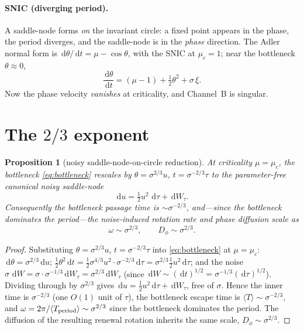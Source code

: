 \documentclass[11pt]{article}
\newtheorem{proposition}{Proposition}
\theoremstyle{remark}
\newcommand{\dd}{\,\mathrm{d}}
\begin{document}
\paragraph{SNIC (diverging period).} A saddle-node forms \emph{on} the invariant circle: a
fixed point appears in the phase, the period diverges, and the saddle-node is in the
\emph{phase} direction. The Adler normal form is $\dd\theta/\dd t=\mu-\cos\theta$, with the
SNIC at $\mu_c=1$; near the bottleneck $\theta\approx0$,
\begin{equation}\label{eq:bottleneck}
  \frac{\dd\theta}{\dd t}=(\mu-1)+\tfrac12\theta^2+\sigma\,\xi .
\end{equation}
Now the phase velocity \emph{vanishes} at criticality, and Channel~B is singular.

\section{The $2/3$ exponent}

\begin{proposition}[noisy saddle-node-on-circle reduction]\label{prop:23}
At criticality $\mu=\mu_c$, the bottleneck \eqref{eq:bottleneck} rescales by
$\theta=\sigma^{2/3}u$, $t=\sigma^{-2/3}\tau$ to the parameter-free canonical noisy
saddle-node
\[
  \dd u=\tfrac12 u^2\,\dd\tau+\dd W_\tau .
\]
Consequently the bottleneck passage time is $\sim\sigma^{-2/3}$, and---since the bottleneck
dominates the period---the noise-induced rotation rate and phase diffusion scale as
\[
  \omega\sim\sigma^{2/3},\qquad D_\phi\sim\sigma^{2/3}.
\]
\end{proposition}

\begin{proof}
Substituting $\theta=\sigma^{2/3}u$, $t=\sigma^{-2/3}\tau$ into \eqref{eq:bottleneck} at
$\mu=\mu_c$: $\dd\theta=\sigma^{2/3}\dd u$; $\tfrac12\theta^2\dd t=\tfrac12\sigma^{4/3}u^2\cdot
\sigma^{-2/3}\dd\tau=\sigma^{2/3}\tfrac12 u^2\dd\tau$; and the noise
$\sigma\,\dd W=\sigma\cdot\sigma^{-1/3}\dd W_\tau=\sigma^{2/3}\dd W_\tau$ (since
$\dd W\sim(\dd t)^{1/2}=\sigma^{-1/3}(\dd\tau)^{1/2}$). Dividing through by $\sigma^{2/3}$
gives $\dd u=\tfrac12 u^2\dd\tau+\dd W_\tau$, free of $\sigma$. Hence the inner time is
$\sigma^{-2/3}$ (one $O(1)$ unit of $\tau$), the bottleneck escape time is
$\langle T\rangle\sim\sigma^{-2/3}$, and $\omega=2\pi/\langle T_{\rm period}\rangle\sim
\sigma^{2/3}$ since the bottleneck dominates the period. The diffusion of the resulting
renewal rotation inherits the same scale, $D_\phi\sim\sigma^{2/3}$.
\end{proof}
\end{document}
